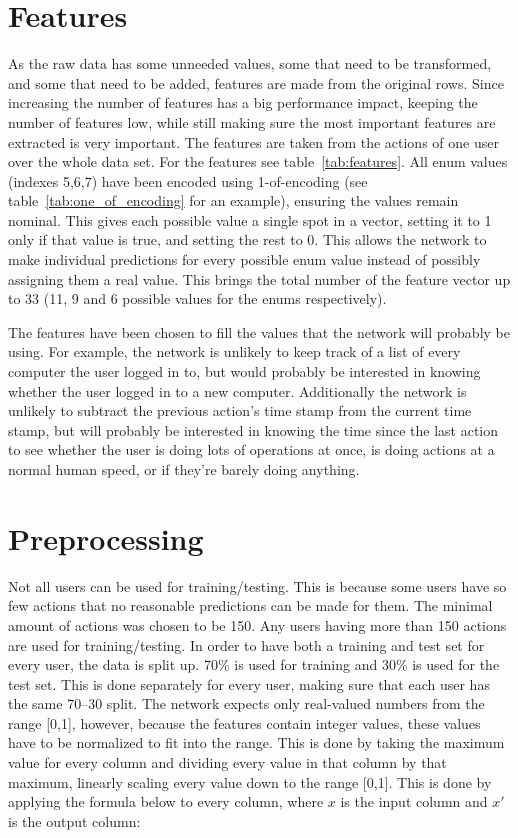 \section{Features}
As the raw data has some unneeded values, some that need to be transformed, and some that need to be added, features are made from the original rows. Since increasing the number of features has a big performance impact, keeping the number of features low, while still making sure the most important features are extracted is very important. The features are taken from the actions of one user over the whole data set. For the features see table~\ref{tab:features}. All enum values (indexes 5,6,7) have been encoded using 1-of-encoding (see table~\ref{tab:one_of_encoding} for an example), ensuring the values remain nominal. This gives each possible value a single spot in a vector, setting it to 1 only if that value is true, and setting the rest to 0. This allows the network to make individual predictions for every possible enum value instead of possibly assigning them a real value. This brings the total number of the feature vector up to 33 (11, 9 and 6 possible values for the enums respectively).

The features have been chosen to fill the values that the network will probably be using. For example, the network is unlikely to keep track of a list of every computer the user logged in to, but would probably be interested in knowing whether the user logged in to a new computer. Additionally the network is unlikely to subtract the previous action's time stamp from the current time stamp, but will probably be interested in knowing the time since the last action to see whether the user is doing lots of operations at once, is doing actions at a normal human speed, or if they're barely doing anything.

\section{Preprocessing}
Not all users can be used for training/testing. This is because some users have so few actions that no reasonable predictions can be made for them. The minimal amount of actions was chosen to be 150. Any users having more than 150 actions are used for training/testing. In order to have both a training and test set for every user, the data is split up. 70\% is used for training and 30\% is used for the test set. This is done separately for every user, making sure that each user has the same 70--30 split. The network expects only real-valued numbers from the range [0,1], however, because the features contain integer values, these values have to be normalized to fit into the range. This is done by taking the maximum value for every column and dividing every value in that column by that maximum, linearly scaling every value down to the range [0,1]. This is done by applying the formula below to every column, where \(x\) is the input column and \(x'\) is the output column:

